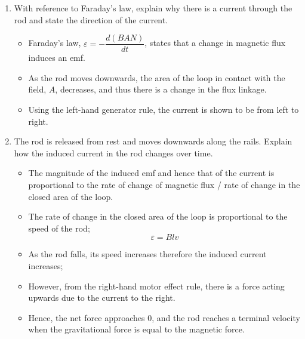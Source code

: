 \documentclass[a4paper,12pt]{article}
\begin{document}
\begin{enumerate}[label=(\alph*)]
  \item With reference to Faraday's law, explain why there is a current through the rod and state the direction of the current.
        \begin{itemize}
          \item Faraday's law, $\varepsilon = -\dfrac{d(BAN)}{dt}$, states that a change in magnetic flux induces an emf.
          \item As the rod moves downwards, the area of the loop in contact with the field, $A$, decreases, and thus there is a change in the flux linkage.
          \item Using the left-hand generator rule, the current is shown to be from left to right.
        \end{itemize}
  \item The rod is released from rest and moves downwards along the rails. Explain how the induced current in the rod changes over time.
        \begin{itemize}
          \item The magnitude of the induced emf and hence that of the current is proportional to the rate of change of magnetic flux / rate of change in the closed area of the loop.
          \item The rate of change in the closed area of the loop is proportional to the speed of the rod; $$\varepsilon = Blv$$
          \item As the rod falls, its speed increases therefore the induced current increases;
          \item However, from the right-hand motor effect rule, there is a force acting upwards due to the current to the right.
          \item Hence, the net force approaches 0, and the rod reaches a terminal velocity when the gravitational force is equal to the magnetic force.
        \end{itemize}
\end{enumerate}
\end{document}
